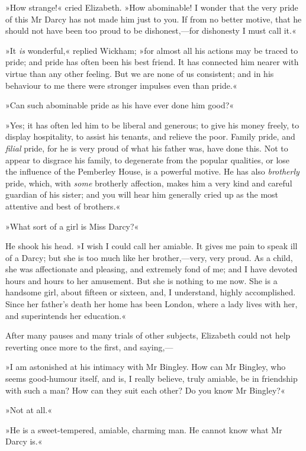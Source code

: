 »How strange!« cried Elizabeth. »How abominable! I wonder that the very pride of this Mr Darcy has not made him just to you. If from no better motive, that he should not have been too proud to be dishonest,—for dishonesty I must call it.«

»It \textit{is} wonderful,« replied Wickham; »for almost all his actions may be traced to pride; and pride has often been his best friend. It has connected him nearer with virtue than any other feeling. But we are none of us consistent; and in his behaviour to me there were stronger impulses even than pride.«

»Can such abominable pride as his have ever done him good?«

»Yes; it has often led him to be liberal and generous; to give his money freely, to display hospitality, to assist his tenants, and relieve the poor. Family pride, and \textit{filial} pride, for he is very proud of what his father was, have done this. Not to appear to disgrace his family, to degenerate from the popular qualities, or lose the influence of the Pemberley House, is a powerful motive. He has also \textit{brotherly} pride, which, with \textit{some} brotherly affection, makes him a very kind and careful guardian of his sister; and you will hear him generally cried up as the most attentive and best of brothers.«

»What sort of a girl is Miss Darcy?«

He shook his head. »I wish I could call her amiable. It gives me pain to speak ill of a Darcy; but she is too much like her brother,—very, very proud. As a child, she was affectionate and pleasing, and extremely fond of me; and I have devoted hours and hours to her amusement. But she is nothing to me now. She is a handsome girl, about fifteen or sixteen, and, I understand, highly accomplished. Since her father's death her home has been London, where a lady lives with her, and superintends her education.«

After many pauses and many trials of other subjects, Elizabeth could not help reverting once more to the first, and saying,—

»I am astonished at his intimacy with Mr Bingley. How can Mr Bingley, who seems good-humour itself, and is, I really believe, truly amiable, be in friendship with such a man? How can they suit each other? Do you know Mr Bingley?«

»Not at all.«

»He is a sweet-tempered, amiable, charming man. He cannot know what Mr Darcy is.«

